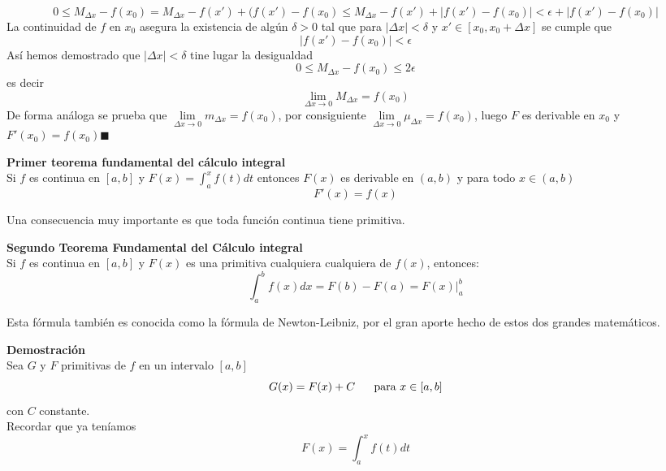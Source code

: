 \documentclass[10pt,twoside]{SelfArx} %
\begin{document}
\begin{equation}
0\leq M_{\Delta x}-f(x_{0})=M_{\Delta x}-f(x')+(f(x')-f(x_{0})\leq M_{\Delta x}-f(x')+|f(x')-f(x_{0})|<\epsilon+|f(x')-f(x_{0})|
\end{equation}
La continuidad de $ f $ en $ x_{0} $ asegura la existencia de algún $ \delta>0  $ tal que para $ |\Delta x|<\delta $ y $ x'\in [x_{0}, x_{0}+\Delta x] $ se cumple que 
\begin{equation}
|f(x')-f(x_{0})|<\epsilon
\end{equation}
Así hemos demostrado que $ |\Delta x|<\delta $ tine lugar la desigualdad 
\begin{equation}
0\leq M_{\Delta x}-f(x_{0})\leq 2\epsilon
\end{equation}
es decir 
\begin{equation}
\lim\limits_{\Delta x\rightarrow0}M_{\Delta x}=f(x_{0})
\end{equation}
De forma análoga se prueba que $ \lim\limits_{\Delta x\rightarrow0}m_{\Delta x}=f(x_{0}) $, por consiguiente $ \lim\limits_{\Delta x\rightarrow0}\mu_{\Delta x}=f(x_{0}) $, luego $ F $ es derivable en  $ x_{0} $ y $ F'(x_{0})=f(x_{0}) \blacksquare$




 \begin{teorema}
 	\textbf{Primer teorema fundamental del cálculo integral}\\
 	Si $ f $ es continua en $ [a,b] $ y $ F(x)=\int_{a}^{x}f(t)dt $ entonces $ F(x) $ es derivable en $ (a,b) $ y para todo $ x\in(a,b) $ 
 	\begin{equation}
 	F'(x)=f(x)
 	\end{equation}
 \end{teorema} 
 Una consecuencia muy importante es que toda función continua tiene primitiva.
 
 
 \begin{teorema}
 	\textbf{Segundo Teorema Fundamental del Cálculo integral}\\
 	Si $ f  $ es continua en $ [a,b] $ y $ F(x) $ es una primitiva cualquiera cualquiera de $ f(x) $, entonces:
 	\begin{equation}
 	\int_{a}^{b}f(x)dx=F(b)-F(a)=F(x)\bigg|_{a}^{b}
 	\end{equation}
 \end{teorema}
 Esta fórmula también es conocida como la fórmula de Newton-Leibniz, por el gran aporte hecho de estos dos grandes matem\'aticos.
 
 
 \textbf{Demostración}\\
 Sea $ G $ y $ F $ primitivas de $ f $ en un intervalo $ [a,b] $
 \begin{equation}
 G(x)=F(x)+C\;\;\;\;\;\;	\mbox{para $ x\in [a,b] $}
 \end{equation}
con   $ C $ constante. \\
 Recordar que ya teníamos
\[ F(x) =\int_{a}^{x}f(t)dt \]
\end{document}
